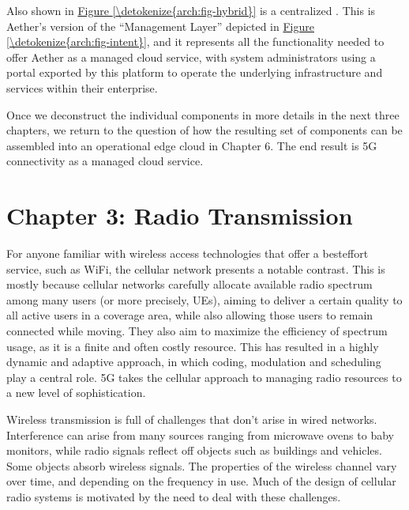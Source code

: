 \documentclass[a4paper,11pt,english]{sphinxmanual}
\begin{document}
\sphinxAtStartPar
Also shown in \hyperref[\detokenize{arch:fig-hybrid}]{Figure \ref{\detokenize{arch:fig-hybrid}}} is a centralized
. This is Aether’s version of the
“Management Layer” depicted in \hyperref[\detokenize{arch:fig-intent}]{Figure \ref{\detokenize{arch:fig-intent}}}, and it
represents all the functionality needed to offer Aether as a managed
cloud service, with system administrators using a portal exported by
this platform to operate the underlying infrastructure and services
within their enterprise.

\sphinxAtStartPar
Once we deconstruct the individual components in more details in the
next three chapters, we return to the question of how the resulting
set of components can be assembled into an operational edge cloud in
Chapter 6. The end result is 5G connectivity as a managed cloud service.


\chapter{Chapter 3:  Radio Transmission}
\label{\detokenize{radio:chapter-3-radio-transmission}}\label{\detokenize{radio::doc}}
\sphinxAtStartPar
For anyone familiar with wireless access technologies that offer a
best\sphinxhyphen{}effort service, such as Wi\sphinxhyphen{}Fi, the cellular network presents a
notable contrast. This is mostly because cellular networks carefully
allocate available radio spectrum among many users (or more precisely,
UEs), aiming to deliver a certain quality to all active users in a
coverage area, while also allowing those users to remain connected
while moving. They also aim to maximize the efficiency of spectrum
usage, as it is a finite and often costly resource. This has resulted
in a highly dynamic and adaptive approach, in which coding, modulation
and scheduling play a central role. 5G takes the cellular approach to
managing radio resources to a new level of sophistication.

\sphinxAtStartPar
Wireless transmission is full of challenges that don’t arise in wired
networks. Interference can arise from many sources ranging from
microwave ovens to baby monitors, while radio signals reflect off
objects such as buildings and vehicles. Some objects absorb wireless
signals. The properties of the wireless channel vary over time, and
depending on the frequency in use. Much of the design of cellular
radio systems is motivated by the need to deal with these challenges.
\end{document}
